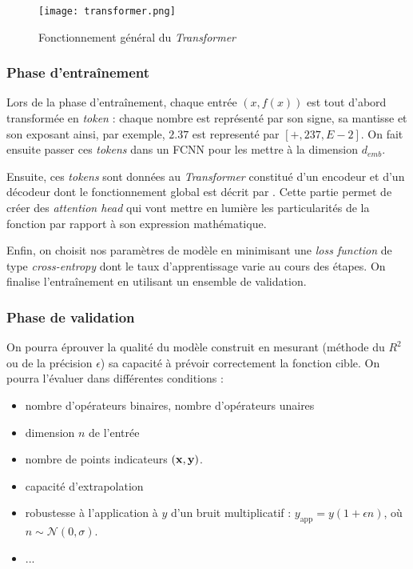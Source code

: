 \documentclass[a4paper,12pt]{article}
\begin{document}
\begin{figure}[h]
    \centering
    \texttt{[image: transformer.png]}
    \caption{Fonctionnement général du \emph{Transformer}}
    \label{fig:transfo}
\end{figure}

\subsubsection{{\color{red}Phase d'entraînement}}

Lors de la phase d'entraînement, chaque entrée $(x,f(x))$ est tout d'abord transformée en \textit{token} : chaque nombre est représenté par son signe, sa mantisse et son exposant ainsi, par exemple, $2.37$ est representé par $[+,237,E-2]$. On fait ensuite passer ces \textit{tokens} dans un FCNN pour les mettre à la dimension $d_{emb}$.

Ensuite, ces \textit{tokens} sont données au \emph{Transformer} constitué d'un encodeur et d'un décodeur dont le fonctionnement global est décrit par \cite{avaswani}. Cette partie permet de créer des \textit{attention head} qui vont mettre en lumière les particularités de la fonction par rapport à son expression mathématique.

Enfin, on choisit nos paramètres de modèle en minimisant une \textit{loss function} de type \textit{cross-entropy} dont le taux d'apprentissage varie au cours des étapes. On finalise l'entraînement en utilisant un ensemble de validation.

\subsubsection{{\color{red}Phase de validation}}

On pourra éprouver la qualité du modèle construit en mesurant (méthode du $R^2$ ou de la précision $\epsilon$) sa capacité à prévoir correctement la fonction cible. On pourra l'évaluer dans différentes conditions : 

\begin{itemize}
\item nombre d'opérateurs binaires, nombre d'opérateurs unaires 
\item dimension $n$ de l'entrée
\item nombre de points indicateurs $(\vb x, \vb y)$.
\item capacité d'extrapolation
\item robustesse à l'application à $y$ d'un bruit multiplicatif : $y_{\text{app}} = y(1+\epsilon n)$, où $n \sim \mathcal N (0, \sigma)$.
\item ...
\end{itemize}
\end{document}
